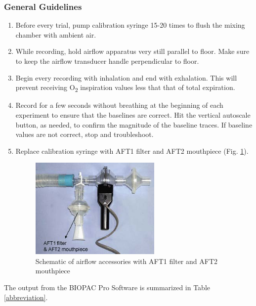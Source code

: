 \documentclass{article}
\begin{document}
\subsubsection*{General Guidelines}
\begin{enumerate}
	\item Before every trial, pump calibration syringe 15-20 times to flush the mixing chamber with ambient air.
	\item While recording, hold airflow apparatus very still parallel to floor. Make sure to keep the airflow transducer handle perpendicular to floor.
	\item Begin every recording with inhalation and end with exhalation. This will prevent receiving O\textsubscript{2} inspiration values less that that of total expiration.
	\item Record for a few seconds without breathing at the beginning of each experiment to ensure that the baselines are correct. Hit the vertical autoscale button, as needed, to confirm the magnitude of the baseline traces. If baseline values are not correct, stop and troubleshoot.
	\item Replace calibration syringe with AFT1 filter and AFT2 mouthpiece (Fig. \ref{syringe}).
	\begin{figure}[h]
	\centering\includegraphics[width=0.6\textwidth]{../images/PF_II_8.jpg}
	\caption{Schematic of airflow accessories with AFT1 filter and AFT2 mouthpiece}
	\label{syringe}
	\end{figure}
\end{enumerate}

The output from the BIOPAC Pro Software is summarized in Table \ref{abbreviation}.
\end{document}
